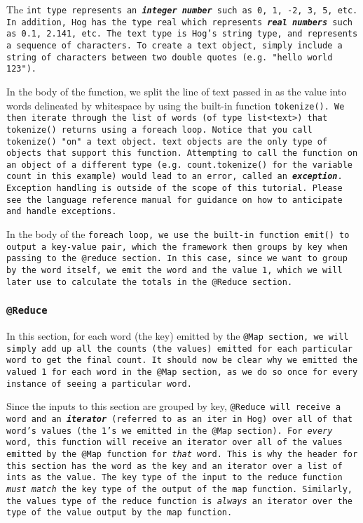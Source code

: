 \documentclass{article} \usepackage{fancyhdr, multicol}
\begin{document}
The \tt int \rm type represents an \textbf{\emph{integer number}} such as 0, 1, -2,
3, 5, etc. In addition, Hog has the type \tt real \rm which represents
\textbf{\emph{real numbers}} such as 0.1, 2.141, etc. The \tt text \rm type is
Hog's string type, and represents a sequence of characters. To create a \tt text
\rm object, simply include a string of characters between two double quotes (e.g.
\tt "hello world 123"\rm).

In the body of the function, we split the line of text passed in as the value into
words delineated by whitespace by using the built-in function \tt tokenize()\rm. We
then iterate through the \tt list \rm of words (of type \tt list<text>\rm) that \tt
tokenize() \rm returns using a \tt foreach \rm loop. Notice that you call \tt
tokenize() \rm "on" a \tt text \rm object. \tt text \rm objects are the only type
of objects that support this function. Attempting to call the function on an object
of a different type (e.g. \tt count.tokenize() \rm for the variable \tt count \rm
in this example) would lead to an error, called an \textbf{\emph{exception}}.
Exception handling is outside of the scope of this tutorial. Please see the
language reference manual for guidance on how to anticipate and handle exceptions.

In the body of the \tt foreach \rm loop, we use the built-in function \tt emit()
\rm to output a key-value pair, which the framework then groups by key when passing
to the \tt @reduce \rm section. In this case, since we want to group by the word
itself, we emit the word and the value \tt 1\rm, which we will later use to
calculate the totals in the \tt @Reduce \rm section.

\subsubsection*{\tt @Reduce \rm}


In this section, for each word (the key) emitted by the \tt @Map \rm section, we
will simply add up all the counts (the values) emitted for each particular word to
get the final count. It should now be clear why we emitted the valued \tt 1 \rm for
each word in the \tt @Map \rm section, as we do so once for every instance of
seeing a particular word.

Since the inputs to this section are grouped by key, \tt @Reduce \rm will receive a
word and an \textbf{\emph{iterator}} (referred to as an \tt iter \rm in Hog) over
all of that word's values (the \tt 1\rm's we emitted in the \tt @Map \rm section).
For \emph{every} word, this function will receive an iterator over all of the
values emitted by the \tt @Map \rm function for \emph{that} word. This is why the
header for this section has the word as the key and an iterator over a \tt list \rm
of \tt int\rm s as the value. The key type of the input to the reduce function
\emph{must match} the key type of the output of the map function. Similarly, the
values type of the reduce function is \emph{always} an iterator over the type of
the value output by the map function.
\end{document}
